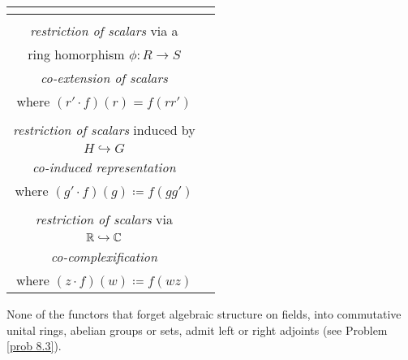 \begin{example}
\begin{center}
{\begin{longtable}{|c|c|}
{    }\\
    \hline
    \makecell{$\phi^*:\ncat{Mod}_S \to \ncat{Mod}_R$\\[0.2em] \emph{restriction of scalars} via a\\ ring homorphism $\phi:R \to S$} & \makecell{$F(M) = \phi_*(M) = \mathrm{Hom}_S(R,M)$\\[0.2em] \emph{co-extension of scalars}\\ where $(r'\cdot f)(r) = f(rr')$}\\
    \hline
    \makecell{$\mathrm{Res}_H^G:\ncat{Mod}_{kG} \to \ncat{Mod}_{kH}$\\[0.2em] \emph{restriction of scalars} induced by\\ $H \hookrightarrow G$} & \makecell{$F'(M) = \mathrm{CoInd}_H^G(M) = \mathrm{Hom}_{kH}(kG,M)$\\[0.2em]\emph{co-induced representation}\\ where $(g'\cdot f)(g) \coloneqq f(gg')$%
    }\\
    \hline
    \makecell{$U:\ncat{Vec}_\cc\,(=\ncat{Mod}_\cc) \to \ncat{Vec}_\rr\,(=\ncat{Mod}_\rr)$\\[0.2em] \emph{restriction of scalars} via\\ $\mathbb R \hookrightarrow \mathbb C$} & \makecell{$F'(V) = \mathrm{Hom}_{\rr}(\cc,V)$\\[0.2em] \emph{co-complexification}\\ where $(z\cdot f)(w) \coloneqq f(wz)$}\\
    \hline
    \end{longtable}}
    \end{center}
\vspace*{-1em}
None of the functors that forget algebraic structure on fields, into commutative unital rings, abelian groups or sets, admit left or right adjoints (see Problem \ref{prob 8.3}).
\end{example}

\vspace*{0.1in}

